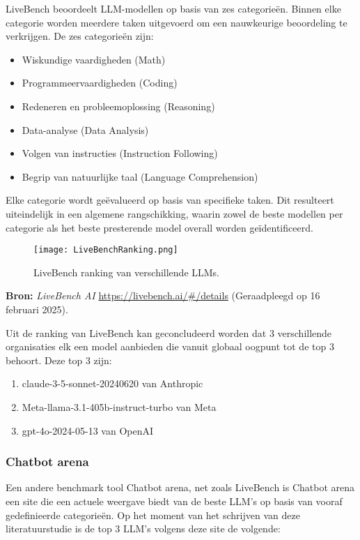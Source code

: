     LiveBench beoordeelt LLM-modellen op basis van zes categorieën. Binnen elke categorie worden meerdere taken uitgevoerd om een nauwkeurige beoordeling te verkrijgen. De zes categorieën zijn:
    \begin{itemize}
        \item Wiskundige vaardigheden (Math)
        \item Programmeervaardigheden (Coding)
        \item Redeneren en probleemoplossing (Reasoning)
        \item Data-analyse (Data Analysis)
        \item Volgen van instructies (Instruction Following)
        \item Begrip van natuurlijke taal (Language Comprehension)
    \end{itemize}
    
    Elke categorie wordt geëvalueerd op basis van specifieke taken. Dit resulteert uiteindelijk in een algemene rangschikking, waarin zowel de beste modellen per categorie als het beste presterende model overall worden geïdentificeerd.
    
    \begin{figure}[H]
        \centering
        \texttt{[image: LiveBenchRanking.png]}
        \caption{LiveBench ranking van verschillende LLMs.}
        \label{fig:livebench}
    \end{figure}
    
    \noindent\textbf{Bron:} \textit{LiveBench AI} \url{https://livebench.ai/#/details} (Geraadpleegd op 16 februari 2025).
    
    Uit de ranking van LiveBench kan geconcludeerd worden dat 3 verschillende organisaties elk een model aanbieden die vanuit globaal oogpunt tot de top 3 behoort. Deze top 3 zijn: 
    \begin{enumerate}
        \item claude-3-5-sonnet-20240620 van Anthropic
        \item Meta-llama-3.1-405b-instruct-turbo van Meta
        \item gpt-4o-2024-05-13 van OpenAI
    \end{enumerate}
    
    \subsubsection{Chatbot arena} 
    
    Een andere benchmark tool Chatbot arena, net zoals LiveBench is Chatbot arena een site die een actuele weergave biedt van de beste LLM's op basis van vooraf gedefinieerde categorieën. Op het moment van het schrijven van deze literatuurstudie is de top 3 LLM's volgens deze site de volgende:
    
